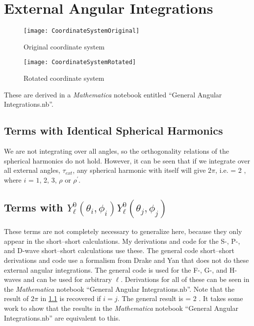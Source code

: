 \documentclass[Dissertation.tex]{subfiles}
\begin{document}
\section{External Angular Integrations}
\label{sec:AngularInt}

\begin{figure}[H]
	\centering
	\texttt{[image: CoordinateSystemOriginal]}
	\caption{Original coordinate system}
	\label{fig:CoordinateSystemOriginal}
\end{figure}

\begin{figure}[H]
	\centering
	\texttt{[image: CoordinateSystemRotated]}
	\caption{Rotated coordinate system}
	\label{fig:CoordinateSystemRotated}
\end{figure}

These are derived in a \emph{Mathematica} notebook entitled ``General Angular Integrations.nb''.

\subsection{Terms with Identical Spherical Harmonics}
\label{sec:AngSame}
We are not integrating over all angles, so the orthogonality relations of the spherical harmonics do not hold. However, it can be seen that if we integrate over all external angles, $\tau_{ext}$, any spherical harmonic with itself will give $2\pi$, i.e.
\beq
\label{eq:AngSame}
 = 2 \pi,
\eeq
where $i$ = $1$, 2, 3, $\rho$ or $\rho^\prime$.


\subsection{Terms with \texorpdfstring{$Y_\ell^0(\theta_i, \phi_i) Y_\ell^0(\theta_j, \phi_j)$}{Yi-Yj} }
\label{sec:AngRiRj}
These terms are not completely necessary to generalize here, because they only appear in the short--short calculations. My derivations and code for the S-, P-, and D-wave short--short calculations use these. The general code short--short derivations and code \cite{sec:} use a formalism from Drake and Yan \cite{Yan1997} that does not do these external angular integrations. The general code is used for the F-, G-, and H-waves and can be used for arbitrary $\ell$. Derivations for all of these can be seen in the \emph{Mathematica} notebook ``General Angular Integrations.nb''. Note that the result of $2\pi$ in \cref{sec:AngSame} is recovered if $i=j$. The general result is
\beq
\label{eq:AngRiRj}
 = 2 \pi {}.
\eeq
It takes some work to show that the results in the \emph{Mathematica} notebook ``General Angular Integrations.nb'' are equivalent to this.
\end{document}
